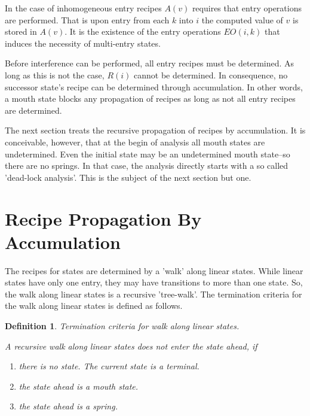 \documentclass[12pt,a4paper]{scrartcl}
\theoremstyle{break}
\newtheorem{definition}{Definition}
\begin{document}
In the case of inhomogeneous entry recipes $A(v)$ requires that entry
operations are performed.  That is upon entry from each $k$ into $i$ the
computed value of $v$ is stored in $A(v)$.  It is the existence of the entry
operations $EO(i,k)$ that induces the necessity of multi-entry states.  

Before interference can be performed, all entry recipes must be determined.  As
long as this is not the case, $R(i)$ cannot be determined. In consequence, no
successor state's recipe can be determined through accumulation. In other
words,  a mouth state blocks any propagation of recipes as long as not all
entry recipes are determined. 

The next section treats the recursive propagation of recipes by accumulation.
It is conceivable, however, that at the begin of analysis all mouth states are
undetermined. Even the initial state may be an undetermined mouth state--so
there are no springs. In that case, the analysis directly starts with a so
called 'dead-lock analysis'. This is the subject of the next section but one.

%
\section{Recipe Propagation By Accumulation}

The recipes for states are determined by a 'walk' along linear states. While
linear states have only one entry, they may have transitions to more than one
state. So, the walk along linear states is a recursive 'tree-walk'. The
termination criteria for the walk along linear states is defined as follows.

\begin{definition}
Termination criteria for walk along linear states.

A recursive walk along linear states does not enter the
state ahead, if 

\begin{enumerate}
    \item there is no state. The current state is a terminal.
    \item the state ahead is a mouth state.
    \item the state ahead is a spring.
\end{enumerate}
\end{definition}
\end{document}
